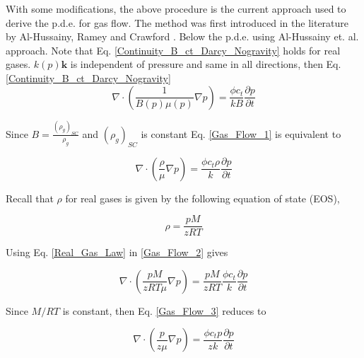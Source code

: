 \documentclass{llncs}
\numberwithin{equation}{section}
\numberwithin{figure}{section}
\numberwithin{table}{section}
\begin{document}
    With some modifications, the above procedure is the current approach used to derive the p.d.e. for gas flow. The method was first introduced in the literature by Al-Hussainy, Ramey and Crawford \cite{Al-Hussainy_1966_1}. Below the p.d.e.  using Al-Hussainy et. al. \cite{Al-Hussainy_1966_1} approach.  Note that Eq. \ref{Continuity_B_ct_Darcy_Nogravity} holds for real gases.  $k(p)\mathbf{k}$ is independent of pressure and same in all directions, then Eq. \ref{Continuity_B_ct_Darcy_Nogravity} 
    \begin{equation}
        \nabla \cdot \left( \frac{1}{B\left( p \right)\mu \left( p \right)}\nabla p \right)=\frac{\phi {{c}_{t}}}{kB}\frac{\partial p}{\partial t}
        \label{Gas_Flow_1}
    \end{equation}

    Since $B=\frac{{{\left( {{\rho }_{g}} \right)}_{SC}}}{{{\rho }_{g}}}$ and ${{\left( {{\rho }_{g}} \right)}_{SC}}$ is constant Eq. \ref{Gas_Flow_1} is equivalent to

    \begin{equation}
        \nabla \cdot \left( \frac{\rho }{\mu }\nabla p \right)=\frac{\phi {{c}_{t}}\rho }{k}\frac{\partial p}{\partial t}
        \label{Gas_Flow_2}
    \end{equation}

    Recall that $\rho$ for real gases is given by the following equation of state (EOS),

    \begin{equation}
        \rho =\frac{pM}{zRT}
        \label{Real_Gas_Law}
    \end{equation}

    Using Eq. \ref{Real_Gas_Law} in \ref{Gas_Flow_2} gives

    \begin{equation}
        \nabla \cdot \left( \frac{pM}{zRT\mu }\nabla p \right)=\frac{pM}{zRT}\frac{\phi {{c}_{t}}}{k}\frac{\partial p}{\partial t}
        \label{Gas_Flow_3}
    \end{equation}

    Since $M/RT$ is constant, then Eq. \ref{Gas_Flow_3} reduces to

    \begin{equation}
        \nabla \cdot \left( \frac{p}{z\mu }\nabla p \right)=\frac{\phi {{c}_{t}}p}{zk}\frac{\partial p}{\partial t}
        \label{Gas_Flow_4}
    \end{equation}
\end{document}
